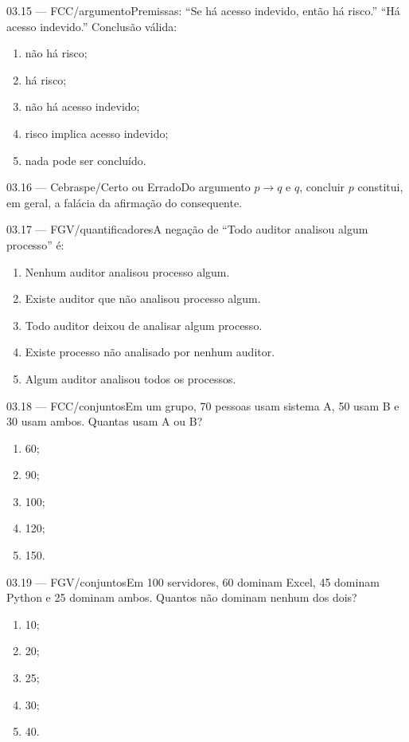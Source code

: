 \begin{questao}{ 03.15 — FCC/argumento}Premissas: ``Se há acesso indevido, então há risco.'' ``Há acesso indevido.'' Conclusão válida:\begin{enumerate}[label=\Alph*)]\item não há risco;\item há risco;\item não há acesso indevido;\item risco implica acesso indevido;\item nada pode ser concluído.\end{enumerate}\end{questao}
\begin{questao}{ 03.16 — Cebraspe/Certo ou Errado}Do argumento $p\to q$ e $q$, concluir $p$ constitui, em geral, a falácia da afirmação do consequente.\end{questao}
\begin{questao}{ 03.17 — FGV/quantificadores}A negação de ``Todo auditor analisou algum processo'' é:\begin{enumerate}[label=\Alph*)]\item Nenhum auditor analisou processo algum.\item Existe auditor que não analisou processo algum.\item Todo auditor deixou de analisar algum processo.\item Existe processo não analisado por nenhum auditor.\item Algum auditor analisou todos os processos.\end{enumerate}\end{questao}
\begin{questao}{ 03.18 — FCC/conjuntos}Em um grupo, 70 pessoas usam sistema A, 50 usam B e 30 usam ambos. Quantas usam A ou B?\begin{enumerate}[label=\Alph*)]\item 60;\item 90;\item 100;\item 120;\item 150.\end{enumerate}\end{questao}
\begin{questao}{ 03.19 — FGV/conjuntos}Em 100 servidores, 60 dominam Excel, 45 dominam Python e 25 dominam ambos. Quantos não dominam nenhum dos dois?\begin{enumerate}[label=\Alph*)]\item 10;\item 20;\item 25;\item 30;\item 40.\end{enumerate}\end{questao}
